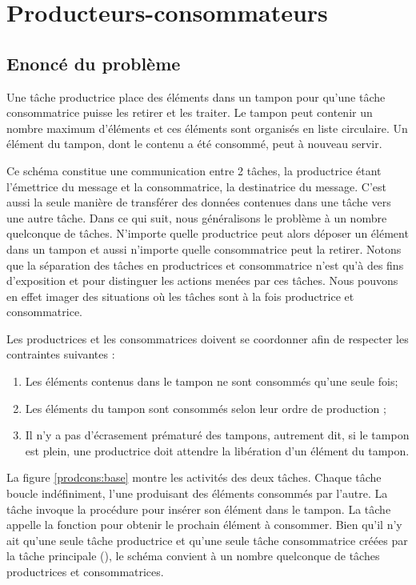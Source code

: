 \chapter{Producteurs-consommateurs}
\startchapter
\section{Enoncé du problème}
Une tâche productrice place des éléments dans un tampon pour qu'une tâche consommatrice puisse les retirer et les traiter. Le tampon peut contenir un nombre maximum d'éléments et ces éléments sont organisés en liste circulaire. Un élément du tampon, dont le contenu a été consommé, peut à nouveau servir.

Ce schéma constitue une communication entre 2 tâches, la productrice étant l'émettrice du message et la consommatrice, la destinatrice du message. C'est aussi la seule manière de transférer des données contenues dans une tâche vers une autre tâche. Dans ce qui suit, nous généralisons le problème à un nombre quelconque de tâches. N'importe quelle productrice peut alors déposer un élément dans un tampon et aussi n'importe quelle consommatrice peut la retirer. Notons que la séparation des tâches en productrices et consommatrice n'est qu'à des fins d'exposition et pour distinguer les actions menées par ces tâches. Nous pouvons en effet imager des situations où les tâches sont à la fois productrice et consommatrice.

Les productrices et les consommatrices doivent se coordonner afin de respecter les contraintes suivantes :
\begin{enumerate}
\item Les éléments contenus dans le tampon ne sont consommés qu'une seule fois;
\item Les éléments  du tampon sont consommés selon leur ordre de production ;
\item Il n'y a pas d'écrasement prématuré des tampons, autrement dit, si le tampon est plein, une productrice doit attendre la libération d'un élément du tampon.
\end{enumerate}

La figure \ref{prodcons:base} montre les activités des deux tâches. Chaque tâche boucle indéfiniment, l'une produisant des éléments consommés par l'autre. La tâche  invoque la procédure  pour insérer son élément  dans le tampon. La tâche  appelle la fonction  pour obtenir le prochain élément à consommer.
Bien qu'il n'y ait qu'une seule tâche productrice et qu'une seule tâche consommatrice créées par la tâche principale (), le schéma convient à un nombre quelconque de tâches productrices et consommatrices.

